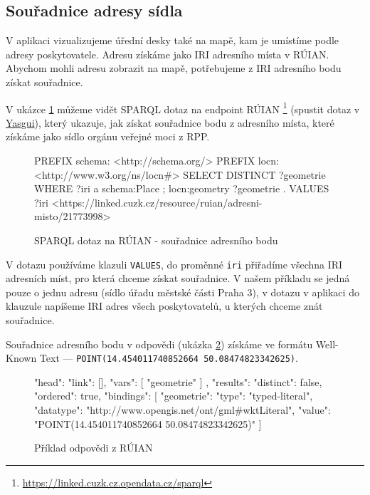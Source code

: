 \subsection{Souřadnice adresy sídla}

V aplikaci vizualizujeme úřední desky také na mapě, kam je umístíme podle adresy poskytovatele. Adresu získáme jako IRI adresního místa v RÚIAN. Aby\-chom mohli adresu zobrazit na mapě, potřebujeme z IRI adresního bodu získat souřadnice.

V ukázce \ref{code:ruian-dotaz} můžeme vidět SPARQL dotaz na endpoint RÚI\-AN \footnote{\url{https://linked.cuzk.cz.opendata.cz/sparql}} (spustit dotaz v \href{https://api.triplydb.com/s/7jxqEz6LL}{Yasgui}), který ukazuje, jak získat souřadnice bodu z adresního místa, které získáme jako sídlo orgánu veřejné moci z RPP.

\begin{figure}
    \label{code:ruian-dotaz}
\begin{code}
PREFIX schema: <http://schema.org/>     
PREFIX locn: <http://www.w3.org/ns/locn#>     
SELECT DISTINCT ?geometrie     
WHERE {      
    ?iri    a schema:Place ;          
            locn:geometry ?geometrie .       
VALUES ?iri {
<https://linked.cuzk.cz/resource/ruian/adresni-misto/21773998> 
    } 
}
\end{code}
\caption{SPARQL dotaz na RÚIAN - souřadnice adresního bodu}
\end{figure}


V dotazu používáme klazuli \texttt{VALUES}, do proměnné \texttt{iri} přiřadíme všechna IRI adresních míst, pro která chceme získat souřadnice. V našem příkladu se jedná pouze o jednu adresu (sídlo úřadu městské části Praha 3), v dotazu v aplikaci do klauzule napíšeme IRI adres všech poskytovatelů, u kterých chceme znát souřadnice.

Souřadnice adresního bodu v odpovědi (ukázka \ref{code:ruian-res}) získáme ve formátu Well-Known Text \cite{WKT} --- \texttt{POINT(14.454011740852664 50.08474823342625)}.

\begin{figure}[h]
    \label{code:ruian-res}
\begin{code}
{
  "head": {
    "link": [],
    "vars": [
      "geometrie"
    ]
  },
  "results": {
    "distinct": false,
    "ordered": true,
    "bindings": [
      {
        "geometrie": {
          "type": "typed-literal",
          "datatype": "http://www.opengis.net/ont/gml#wktLiteral",
          "value": "POINT(14.454011740852664 50.08474823342625)"
        }
      }
    ]
  }
}
\end{code}
\caption{Příklad odpovědi z RÚIAN}
\end{figure}
